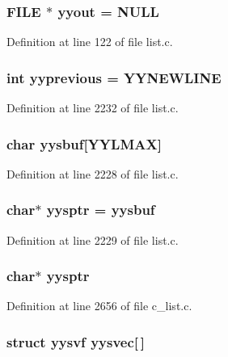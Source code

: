 \subsubsection{\setlength{\rightskip}{0pt plus 5cm}FILE $\ast$ \bf{yyout} = NULL}\label{list_8c_296847b42b0baa62e2af36cb79f3c0eb}




Definition at line 122 of file list.c.
\subsubsection{\setlength{\rightskip}{0pt plus 5cm}int \bf{yyprevious} = YYNEWLINE}\label{list_8c_c38b368bcd0914edeacaf81bb7ac17f8}




Definition at line 2232 of file list.c.
\subsubsection{\setlength{\rightskip}{0pt plus 5cm}char \bf{yysbuf}[YYLMAX]}\label{list_8c_46af289f9828b895efd9c1fdf93b241f}




Definition at line 2228 of file list.c.
\subsubsection{\setlength{\rightskip}{0pt plus 5cm}char$\ast$ \bf{yysptr} = \bf{yysbuf}}\label{list_8c_c2e277904ae84b934c585198523d740b}




Definition at line 2229 of file list.c.
\subsubsection{\setlength{\rightskip}{0pt plus 5cm}char$\ast$ \bf{yysptr}}\label{list_8c_c2e277904ae84b934c585198523d740b}




Definition at line 2656 of file c\_\-list.c.
\subsubsection{\setlength{\rightskip}{0pt plus 5cm}struct \bf{yysvf} \bf{yysvec}[$\,$]}\label{list_8c_2011359449066c5432dae89171db9d17}




